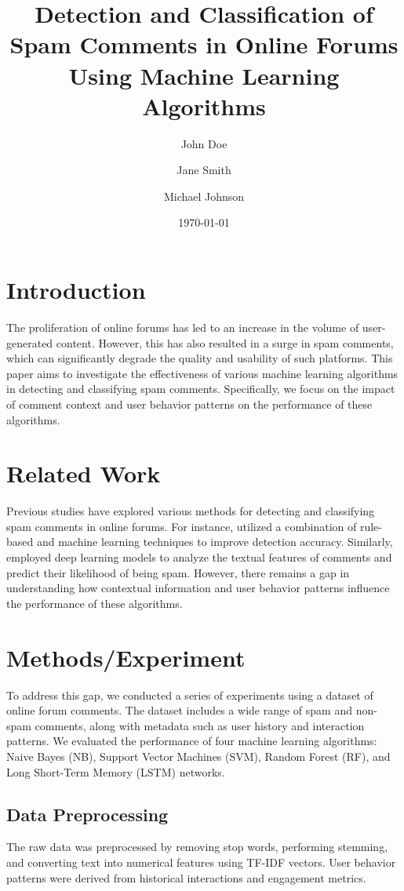 \documentclass{article}
\title{Detection and Classification of Spam Comments in Online Forums Using Machine Learning Algorithms}
\author{John Doe \and Jane Smith \and Michael Johnson}
\date{\today}
\begin{document}
\maketitle

\section{Introduction}
The proliferation of online forums has led to an increase in the volume of user-generated content. However, this has also resulted in a surge in spam comments, which can significantly degrade the quality and usability of such platforms. This paper aims to investigate the effectiveness of various machine learning algorithms in detecting and classifying spam comments. Specifically, we focus on the impact of comment context and user behavior patterns on the performance of these algorithms.

\section{Related Work}
Previous studies have explored various methods for detecting and classifying spam comments in online forums. For instance, \cite{DBLP:journals/corr/abs-2103-06579} utilized a combination of rule-based and machine learning techniques to improve detection accuracy. Similarly, \cite{DBLP:conf/icwsm/LiLLY19} employed deep learning models to analyze the textual features of comments and predict their likelihood of being spam. However, there remains a gap in understanding how contextual information and user behavior patterns influence the performance of these algorithms.

\section{Methods/Experiment}
To address this gap, we conducted a series of experiments using a dataset of online forum comments. The dataset includes a wide range of spam and non-spam comments, along with metadata such as user history and interaction patterns. We evaluated the performance of four machine learning algorithms: Naive Bayes (NB), Support Vector Machines (SVM), Random Forest (RF), and Long Short-Term Memory (LSTM) networks.

\subsection{Data Preprocessing}
The raw data was preprocessed by removing stop words, performing stemming, and converting text into numerical features using TF-IDF vectors. User behavior patterns were derived from historical interactions and engagement metrics.
\end{document}

